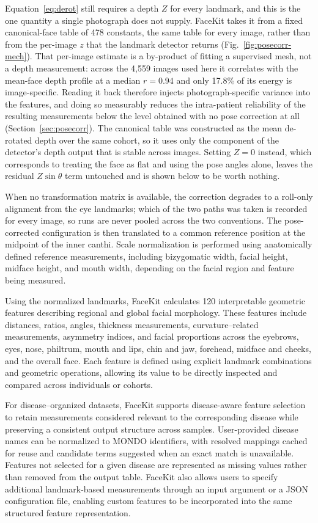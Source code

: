 \documentclass[11pt]{article}
\begin{document}
Equation~\eqref{eq:derot} still requires a depth $Z$ for every landmark, and this
is the one quantity a single photograph does not supply. FaceKit takes it from a
fixed canonical-face table of 478 constants, the same table for every image,
rather than from the per-image $z$ that the landmark detector returns
(Fig.~\ref{fig:posecorr-mech}). That per-image estimate is a by-product of
fitting a supervised mesh, not a depth measurement: across the 4,559 images used
here it correlates with the mean-face depth profile at a median $r=0.94$ and only
17.8\% of its energy is image-specific. Reading it back therefore injects
photograph-specific variance into the features, and doing so measurably reduces
the intra-patient reliability of the resulting measurements below the level
obtained with no pose correction at all (Section~\ref{sec:posecorr}). The
canonical table was constructed as the mean de-rotated depth over the same
cohort, so it uses only the component of the detector's depth output that is
stable across images. Setting $Z = 0$ instead, which corresponds to treating the
face as flat and using the pose angles alone, leaves the residual
$Z\sin\theta$ term untouched and is shown below to be worth nothing.

When no transformation matrix is available, the correction degrades to a
roll-only alignment from the eye landmarks; which of the two paths was taken is
recorded for every image, so runs are never pooled across the two conventions.
The pose-corrected configuration is then translated to a common reference
position at the midpoint of the inner canthi. Scale normalization is performed
using anatomically defined reference measurements, including bizygomatic width,
facial height, midface height, and mouth width, depending on the facial region
and feature being measured.

Using the normalized landmarks, FaceKit calculates 120 interpretable geometric features describing regional and global facial morphology. These features include distances, ratios, angles, thickness measurements, curvature--related measurements, asymmetry indices, and facial proportions across the eyebrows, eyes, nose, philtrum, mouth and lips, chin and jaw, forehead, midface and cheeks, and the overall face. Each feature is defined using explicit landmark combinations and geometric operations, allowing its value to be directly inspected and compared across individuals or cohorts.

For disease--organized datasets, FaceKit supports disease-aware feature selection to retain measurements considered relevant to the corresponding disease while preserving a consistent output structure across samples. User-provided disease names can be normalized to MONDO identifiers, with resolved mappings cached for reuse and candidate terms suggested when an exact match is unavailable. Features not selected for a given disease are represented as missing values rather than removed from the output table. FaceKit also allows users to specify additional landmark-based measurements through an input argument or a JSON configuration file, enabling custom features to be incorporated into the same structured feature representation.
\end{document}
